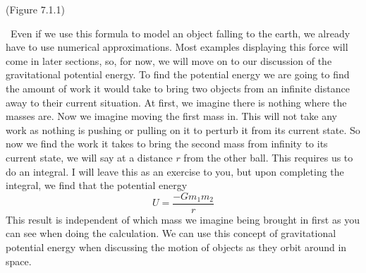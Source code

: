 \newline
{}
\begin{center}
(Figure 7.1.1)
\end{center}
\
Even if we use this formula to model an object falling to the earth, we already have to use numerical approximations. Most examples displaying this force will come in later sections, so, for now, we will move on to our discussion of the gravitational potential energy. 
To find the potential energy we are going to find the amount of work it would take to bring two objects from an infinite distance away to their current situation. At first, we imagine there is nothing where the masses are. Now we imagine moving the first mass in. This will not take any work as nothing is pushing or pulling on it to perturb it from its current state. So now we find the work it takes to bring the second mass from infinity to its current state, we will say at a distance $r$ from the other ball. This requires us to do an integral. I will leave this as an exercise to you, but upon completing the integral, we find that the potential energy \begin{equation} U = \frac{-Gm_1m_2}{r}\end{equation} This result is independent of which mass we imagine being brought in first as you can see when doing the calculation. We can use this concept of gravitational potential energy when discussing the motion of objects as they orbit around in space. 